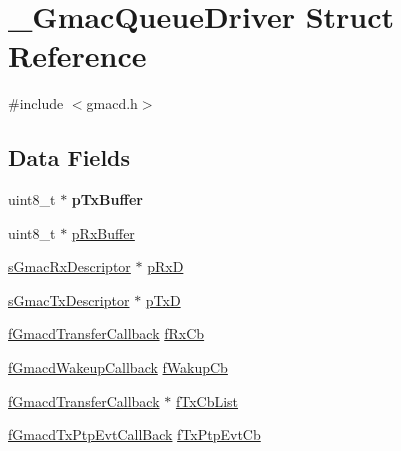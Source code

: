 \hypertarget{struct__GmacQueueDriver}{}\section{\+\_\+\+Gmac\+Queue\+Driver Struct Reference}
\label{struct__GmacQueueDriver}


{\ttfamily \#include $<$gmacd.\+h$>$}

\subsection*{Data Fields}
\begin{DoxyCompactItemize}
\item 
\mbox{\label{struct__GmacQueueDriver_a4bdabc39dd35fe1d1cecdab1f2aca20f}} 
uint8\+\_\+t $\ast$ {\bfseries p\+Tx\+Buffer}
\item 
uint8\+\_\+t $\ast$ \mbox{\hyperlink{struct__GmacQueueDriver_a59f24ea8f745c3de5618eed7b10f6d8e}{p\+Rx\+Buffer}}
\item 
\mbox{\hyperlink{group__gmac__structs_ga60c9fd1b0bff688c6e72c825d088a50b}{s\+Gmac\+Rx\+Descriptor}} $\ast$ \mbox{\hyperlink{struct__GmacQueueDriver_a9f9478c0fcb23fd842b3cadd5d66b4b4}{p\+RxD}}
\item 
\mbox{\hyperlink{group__gmac__structs_ga69a2b24578edebf2e816c4d3ca20edeb}{s\+Gmac\+Tx\+Descriptor}} $\ast$ \mbox{\hyperlink{struct__GmacQueueDriver_a0c5433d9e853b87ce660278db2d20aed}{p\+TxD}}
\item 
\mbox{\hyperlink{group__gmacd__types_ga64979042bf43f697de166e864e3259de}{f\+Gmacd\+Transfer\+Callback}} \mbox{\hyperlink{struct__GmacQueueDriver_a30d05050728f18ee6146aec446281619}{f\+Rx\+Cb}}
\item 
\mbox{\hyperlink{group__gmacd__types_ga44e6be4bb53db0660baf6cb50b20a684}{f\+Gmacd\+Wakeup\+Callback}} \mbox{\hyperlink{struct__GmacQueueDriver_af4818e868c61199911223c4f104b96f3}{f\+Wakup\+Cb}}
\item 
\mbox{\hyperlink{group__gmacd__types_ga64979042bf43f697de166e864e3259de}{f\+Gmacd\+Transfer\+Callback}} $\ast$ \mbox{\hyperlink{struct__GmacQueueDriver_adbff7af552894aab8a3262b07d033976}{f\+Tx\+Cb\+List}}
\item 
\mbox{\hyperlink{group__gmacd__types_gad3329dfe65f5877f50ee8a4fd8e63f08}{f\+Gmacd\+Tx\+Ptp\+Evt\+Call\+Back}} \mbox{\hyperlink{struct__GmacQueueDriver_a583be207a73dc1b281192996aa2dbfa8}{f\+Tx\+Ptp\+Evt\+Cb}}
\item 

\end{DoxyCompactItemize}
